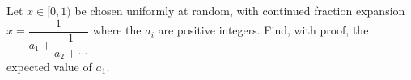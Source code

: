 Let $x\in[0,1)$ be chosen uniformly at random, with continued fraction expansion $x=\dfrac{1}{a_1+\dfrac{1}{a_2+\cdots}}$ where the $a_i$ are positive integers. Find, with proof, the expected value of $a_1$.
